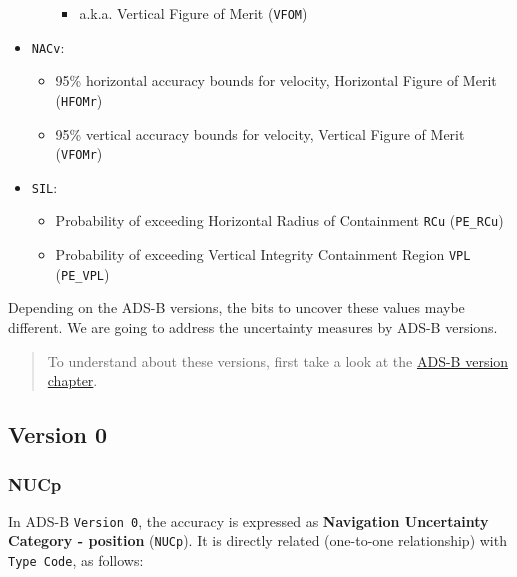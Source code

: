 \begin{itemize}
\begin{itemize}
    \begin{itemize}

    \item
      a.k.a. Vertical Figure of Merit (\texttt{VFOM})
    \end{itemize}
  \end{itemize}
\item
  \texttt{NACv}:

  \begin{itemize}

  \item
    95\% horizontal accuracy bounds for velocity, Horizontal Figure of
    Merit (\texttt{HFOMr})
  \item
    95\% vertical accuracy bounds for velocity, Vertical Figure of Merit
    (\texttt{VFOMr})
  \end{itemize}
\item
  \texttt{SIL}:

  \begin{itemize}

  \item
    Probability of exceeding Horizontal Radius of Containment
    \texttt{RCu} (\texttt{PE\_RCu})
  \item
    Probability of exceeding Vertical Integrity Containment Region
    \texttt{VPL} (\texttt{PE\_VPL})
  \end{itemize}
\end{itemize}

Depending on the ADS-B versions, the bits to uncover these values maybe
different. We are going to address the uncertainty measures by ADS-B
versions.

\begin{quote}
To understand about these versions, first take a look at the
\href{version.html}{ADS-B version chapter}.
\end{quote}

\subsection{Version 0}\label{version-0}

\subsubsection{NUCp}\label{nucp}

In ADS-B \texttt{Version\ 0}, the accuracy is expressed as
\textbf{Navigation Uncertainty Category - position} (\texttt{NUCp}). It
is directly related (one-to-one relationship) with \texttt{Type\ Code},
as follows:

